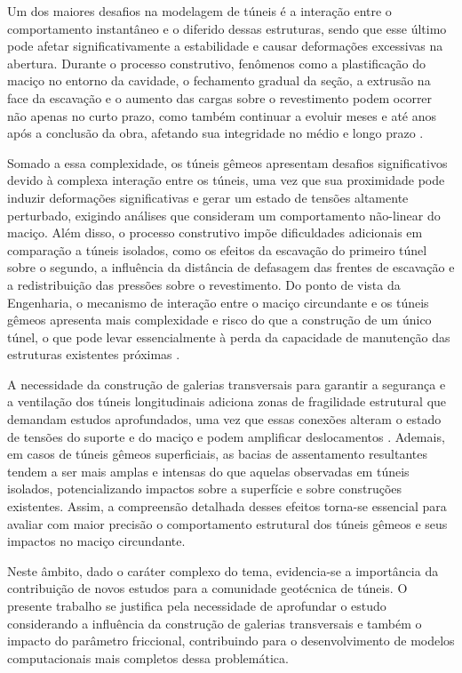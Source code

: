 Um dos maiores desafios na modelagem de túneis é a interação entre o comportamento instantâneo e o diferido dessas estruturas, sendo que esse último pode afetar significativamente a estabilidade e causar deformações excessivas na abertura. Durante o processo construtivo, fenômenos como a plastificação do maciço no entorno da cavidade, o fechamento gradual da seção, a extrusão na face da escavação e o aumento das cargas sobre o revestimento podem ocorrer não apenas no curto prazo, como também continuar a evoluir meses e até anos após a conclusão da obra, afetando sua integridade no médio e longo prazo \cite{Quevedo2021}.

Somado a essa complexidade, os túneis gêmeos apresentam desafios significativos devido à complexa interação entre os túneis, uma vez que sua proximidade pode induzir deformações significativas e gerar um estado de tensões altamente perturbado, exigindo análises que consideram um comportamento não-linear do maciço. Além disso, o processo construtivo impõe dificuldades adicionais em comparação a túneis isolados, como os efeitos da escavação do primeiro túnel sobre o segundo, a influência da distância de defasagem das frentes de escavação e a redistribuição das pressões sobre o revestimento. Do ponto de vista da Engenharia, o mecanismo de interação entre o maciço circundante e os túneis gêmeos apresenta mais complexidade e risco do que a construção de um único túnel, o que pode levar essencialmente à perda da capacidade de manutenção das estruturas existentes próximas \cite{Phutthananon2023}. 

A necessidade da construção de galerias transversais para garantir a segurança e a ventilação dos túneis longitudinais adiciona zonas de fragilidade estrutural que demandam estudos aprofundados, uma vez que essas conexões alteram o estado de tensões do suporte e do maciço e podem amplificar deslocamentos \cite{ChortisKavvadas2023}. Ademais, em casos de túneis gêmeos superficiais, as bacias de assentamento resultantes tendem a ser mais amplas e intensas do que aquelas observadas em túneis isolados, potencializando impactos sobre a superfície e sobre construções existentes. Assim, a compreensão detalhada desses efeitos torna-se essencial para avaliar com maior precisão o comportamento estrutural dos túneis gêmeos e seus impactos no maciço circundante.

Neste âmbito, dado o caráter complexo do tema, evidencia-se a importância da contribuição de novos estudos para a comunidade geotécnica de túneis. O presente trabalho se justifica pela necessidade de aprofundar o estudo considerando a influência da construção de galerias transversais e também o impacto do parâmetro friccional, contribuindo para o desenvolvimento de modelos computacionais mais completos dessa problemática.


